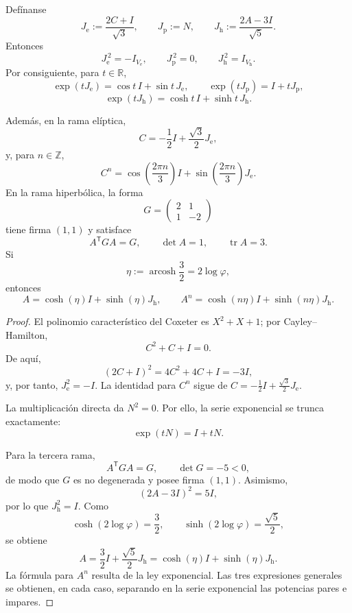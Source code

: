 \begin{theorem}
\label{thm:tres-generadores-concretos-trit}
Defínanse
\[
J_{\mathrm e}:=\frac{2C+I}{\sqrt3},
\qquad
J_{\mathrm p}:=N,
\qquad
J_{\mathrm h}:=\frac{2A-3I}{\sqrt5}.
\]
Entonces
\[
J_{\mathrm e}^{\,2}=-I_{V_{\mathrm e}},
\qquad
J_{\mathrm p}^{\,2}=0,
\qquad
J_{\mathrm h}^{\,2}=I_{V_{\mathrm h}}.
\]
Por consiguiente, para \(t\in\mathbb R\),
\[
\exp(tJ_{\mathrm e})
=\cos t\,I+\sin t\,J_{\mathrm e},
\qquad
\exp(tJ_{\mathrm p})
=I+tJ_{\mathrm p},
\]
\[
\exp(tJ_{\mathrm h})
=\cosh t\,I+\sinh t\,J_{\mathrm h}.
\]

Además, en la rama elíptica,
\[
C=-\frac12I+\frac{\sqrt3}{2}J_{\mathrm e},
\]
y, para \(n\in\mathbb Z\),
\[
C^n=
\cos\!\left(\frac{2\pi n}{3}\right)I
+\sin\!\left(\frac{2\pi n}{3}\right)J_{\mathrm e}.
\]
En la rama hiperbólica, la forma
\[
G=
\begin{pmatrix}
2&1\\
1&-2
\end{pmatrix}
\]
tiene firma \((1,1)\) y satisface
\[
A^{\mathsf T}GA=G,\qquad
\det A=1,\qquad
\operatorname{tr}A=3.
\]
Si
\[
\eta:=\operatorname{arcosh}\frac32=2\log\varphi,
\]
entonces
\[
A=\cosh(\eta)I+\sinh(\eta)J_{\mathrm h},
\qquad
A^n=\cosh(n\eta)I+\sinh(n\eta)J_{\mathrm h}.
\]
\end{theorem}

\begin{proof}
El polinomio característico del Coxeter es \(X^2+X+1\); por
Cayley--Hamilton,
\[
C^2+C+I=0.
\]
De aquí,
\[
(2C+I)^2=4C^2+4C+I=-3I,
\]
y, por tanto, \(J_{\mathrm e}^2=-I\). La identidad para \(C^n\) sigue de
\(C=-\frac12I+\frac{\sqrt3}{2}J_{\mathrm e}\).

La multiplicación directa da \(N^2=0\). Por ello, la serie exponencial se
trunca exactamente:
\[
\exp(tN)=I+tN.
\]

Para la tercera rama,
\[
A^{\mathsf T}GA=G,\qquad
\det G=-5<0,
\]
de modo que \(G\) es no degenerada y posee firma \((1,1)\). Asimismo,
\[
(2A-3I)^2=5I,
\]
por lo que \(J_{\mathrm h}^2=I\). Como
\[
\cosh(2\log\varphi)=\frac32,
\qquad
\sinh(2\log\varphi)=\frac{\sqrt5}{2},
\]
se obtiene
\[
A=\frac32I+\frac{\sqrt5}{2}J_{\mathrm h}
=\cosh(\eta)I+\sinh(\eta)J_{\mathrm h}.
\]
La fórmula para \(A^n\) resulta de la ley exponencial. Las tres expresiones
generales se obtienen, en cada caso, separando en la serie exponencial las
potencias pares e impares.
\end{proof}

